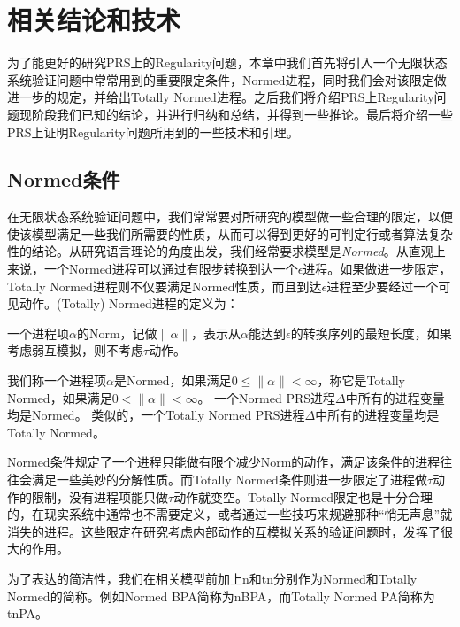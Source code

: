 
\chapter{相关结论和技术}
\label{chap:relat}

为了能更好的研究PRS上的Regularity问题，本章中我们首先将引入一个无限状态系统验证问题中常常用到的重要限定条件，Normed进程，同时我们会对该限定做进一步的规定，并给出Totally Normed进程。之后我们将介绍PRS上Regularity问题现阶段我们已知的结论，并进行归纳和总结，并得到一些推论。最后将介绍一些PRS上证明Regularity问题所用到的一些技术和引理。


\section{Normed条件}
\label{sec:norm}
 
在无限状态系统验证问题中，我们常常要对所研究的模型做一些合理的限定，以便使该模型满足一些我们所需要的性质，从而可以得到更好的可判定行或者算法复杂性的结论。从研究语言理论的角度出发，我们经常要求模型是\emph{Normed}。从直观上来说，一个Normed进程可以通过有限步转换到达一个$\epsilon$进程。如果做进一步限定，Totally Normed进程则不仅要满足Normed性质，而且到达$\epsilon$进程至少要经过一个可见动作。(Totally) Normed进程的定义为：

\begin{defn}\label{def:norm}
一个进程项$\alpha$的Norm，记做$\|\alpha\|$，表示从$\alpha$能达到$\epsilon$的转换序列的最短长度，如果考虑弱互模拟，则不考虑$\tau$动作。

我们称一个进程项$\alpha$是Normed，如果满足$0\leq\|\alpha\|<\infty$，称它是Totally Normed，如果满足$0<\|\alpha\|<\infty$。
一个Normed PRS进程$\Delta$中所有的进程变量均是Normed。
类似的，一个Totally Normed PRS进程$\Delta$中所有的进程变量均是Totally Normed。
\end{defn}

Normed条件规定了一个进程只能做有限个减少Norm的动作，满足该条件的进程往往会满足一些美妙的分解性质。而Totally Normed条件则进一步限定了进程做$\tau$动作的限制，没有进程项能只做$\tau$动作就变空。Totally Normed限定也是十分合理的，在现实系统中通常也不需要定义，或者通过一些技巧来规避那种``悄无声息''就消失的进程。这些限定在研究考虑内部动作的互模拟关系的验证问题时，发挥了很大的作用。

为了表达的简洁性，我们在相关模型前加上n和tn分别作为Normed和Totally Normed的简称。例如Normed BPA简称为nBPA，而Totally Normed PA简称为tnPA。

